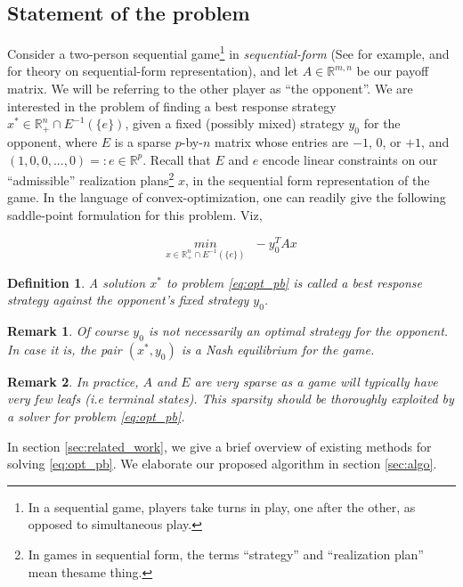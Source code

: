 \documentclass[a4paper,10pt,journal]{IEEEtran}
\newtheorem{remark}{Remark}
\newtheorem{definition}[theorem]{Definition}
\begin{document}
\subsection{Statement of the problem}
Consider a two-person sequential game\footnote{In a sequential game, players take turns in play, one after the other,
as opposed to simultaneous play.} in \textit{sequential-form} (See for example, \cite{von1996efficient} and \cite{koller1996efficient} 
for theory on sequential-form representation), and let $A \in \mathbb{R}^{m,n}$ be our payoff matrix.
We will be referring to the other player as ``the opponent''. We are interested in the problem of
finding a best response strategy $x^* \in \mathbb{R}_{+}^n \cap E^{-1}(\{e\})$, given a fixed
(possibly mixed) strategy $y_0$ for the opponent, where $E$ is a sparse $p$-by-$n$ matrix whose entries are $-1$, $0$, or $+1$,
and $(1, 0, 0, ..., 0) =: e \in \mathbb{R}^p$. Recall that $E$ and $e$ encode linear constraints on our ``admissible''
realization plans\footnote{In games in sequential form, the terms ``strategy'' and ``realization plan''
mean thesame thing.} $x$, in the sequential form representation of the game.
In the language of convex-optimization,
one can readily give the following saddle-point formulation for this problem. Viz,

\begin{equation}
  \underset{x \in \mathbb{R}_{+}^n \cap E^{-1}(\{e\})}{min}\text{ }-y_0^TAx
  \label{eq:opt_pb}
\end{equation}

\begin{definition}
A solution $x^*$ to problem \eqref{eq:opt_pb} is called a \textit{best response} strategy against the opponent's fixed strategy $y_0$.
\end{definition}

\begin{remark}
Of course $y_0$ is not necessarily an optimal strategy for the opponent. In case it is, the pair $(x^*, y_0)$ is a Nash equilibrium for the game.
\end{remark}

\begin{remark}
  In practice, $A$ and $E$ are very sparse as a game will typically have very few leafs
(i.e terminal states). This sparsity should be thoroughly exploited by a solver for problem \eqref{eq:opt_pb}.
\end{remark}

In section \ref{sec:related_work}, we give a brief overview of existing methods for solving \eqref{eq:opt_pb}.
We elaborate our proposed algorithm in section \ref{sec:algo}.
\end{document}
